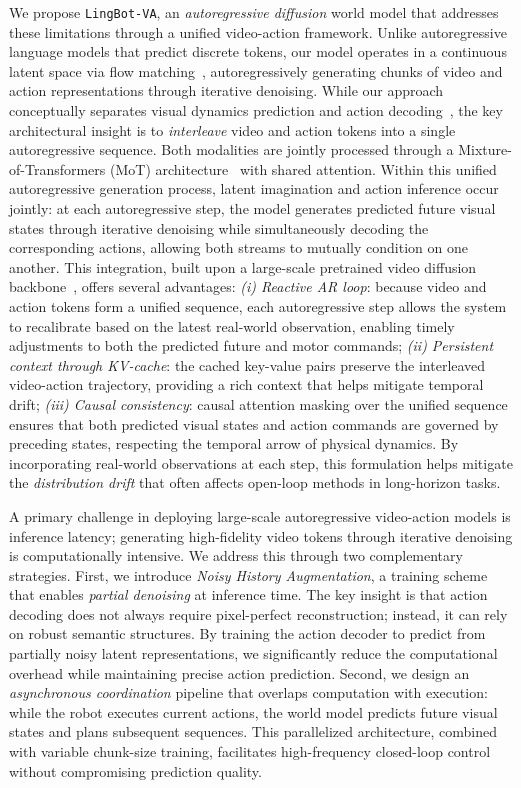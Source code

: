 \documentclass[onecolumn]{robbyant}           %
\newcommand\methodname{LingBot-VA}
\newcommand{\method}{\texttt{\methodname}\xspace}
\begin{document}
We propose \method, an \emph{autoregressive diffusion} world model that addresses these limitations through a unified video-action framework.
Unlike autoregressive language models that predict discrete tokens, our model operates in a continuous latent space via flow matching~\cite{flowmatching,rectifiedflow}, autoregressively generating chunks of video and action representations through iterative denoising.
While our approach conceptually separates visual dynamics prediction and action decoding~\cite{vidar,vpp}, the key architectural insight is to \emph{interleave} video and action tokens into a single autoregressive sequence.
Both modalities are jointly processed through a Mixture-of-Transformers (MoT) architecture~\cite{mot} with shared attention.
Within this unified autoregressive generation process, latent imagination and action inference occur jointly: at each autoregressive step, the model generates predicted future visual states through iterative denoising while simultaneously decoding the corresponding actions, allowing both streams to mutually condition on one another.
This integration, built upon a large-scale pretrained video diffusion backbone~\cite{wan2024video}, offers several advantages:
\emph{(i) Reactive AR loop}: because video and action tokens form a unified sequence, each autoregressive step allows the system to recalibrate based on the latest real-world observation, enabling timely adjustments to both the predicted future and motor commands;
\emph{(ii) Persistent context through KV-cache}: the cached key-value pairs preserve the interleaved video-action trajectory, providing a rich context that helps mitigate temporal drift;
\emph{(iii) Causal consistency}: causal attention masking over the unified sequence ensures that both predicted visual states and action commands are governed by preceding states, respecting the temporal arrow of physical dynamics.
By incorporating real-world observations at each step, this formulation helps mitigate the \emph{distribution drift} that often affects open-loop methods in long-horizon tasks.

A primary challenge in deploying large-scale autoregressive video-action models is inference latency; generating high-fidelity video tokens through iterative denoising is computationally intensive.
We address this through two complementary strategies.
First, we introduce \emph{Noisy History Augmentation}, a training scheme that enables \emph{partial denoising} at inference time.
The key insight is that action decoding does not always require pixel-perfect reconstruction; instead, it can rely on robust semantic structures.
By training the action decoder to predict from partially noisy latent representations, we significantly reduce the computational overhead while maintaining precise action prediction.
Second, we design an \emph{asynchronous coordination} pipeline that overlaps computation with execution: while the robot executes current actions, the world model predicts future visual states and plans subsequent sequences.
This parallelized architecture, combined with variable chunk-size training, facilitates high-frequency closed-loop control without compromising prediction quality.
\end{document}
